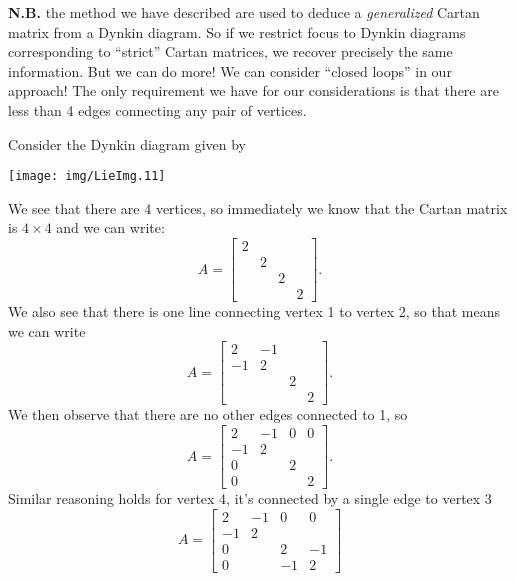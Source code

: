 \begin{framed}
\begin{rmk}
{\bf N.B.} the method we have described are used to deduce a
\emph{generalized} Cartan matrix from a Dynkin diagram. So if we
restrict focus to Dynkin diagrams corresponding to ``strict''
Cartan matrices, we recover precisely the same information. But
we can do more! We can consider ``closed loops'' in our approach!
The only requirement we have for our considerations is that there
are less than 4 edges connecting any pair of vertices.
\end{rmk}
\begin{ex}
Consider the Dynkin diagram given by
\begin{center}
  \texttt{[image: img/LieImg.11]}
\end{center}
We see that there are 4 vertices, so immediately we know that the
Cartan matrix is $4\times4$ and we can write:
\begin{equation}
A = \begin{bmatrix}
2 &   &   &   \\
  & 2 &   &   \\
  &   & 2 &   \\
  &   &   & 2
\end{bmatrix}.
\end{equation}
We also see that there is one line connecting vertex 1 to vertex
2, so that means we can write
\begin{equation}
A = \begin{bmatrix}
2 &-1 &   &   \\
-1& 2 &   &   \\
  &   & 2 &   \\
  &   &   & 2
\end{bmatrix}.
\end{equation}
We then observe that there are no other edges connected to 1, so
\begin{equation}
A = \begin{bmatrix}
2 &-1 & 0 & 0 \\
-1& 2 &   &   \\
0 &   & 2 &   \\
0 &   &   & 2
\end{bmatrix}.
\end{equation}
Similar reasoning holds for vertex 4, it's connected by a single
edge to vertex 3
\begin{equation}
A = \begin{bmatrix}
2 &-1 & 0 & 0 \\
-1& 2 &   &   \\
0 &   & 2 &-1 \\
0 &   &-1 & 2

\end{bmatrix}
\end{equation}
\end{ex}
\end{framed}
